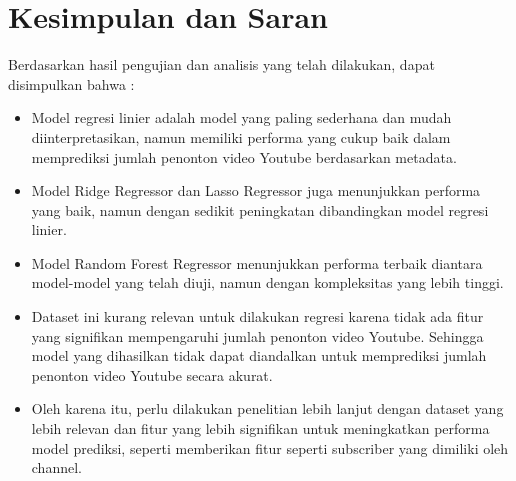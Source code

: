 \newpage
\section{Kesimpulan dan Saran}
Berdasarkan hasil pengujian dan analisis yang telah dilakukan, dapat disimpulkan bahwa : 
\begin{itemize}
    \item Model regresi linier adalah model yang paling sederhana dan mudah diinterpretasikan, namun memiliki performa yang cukup baik dalam memprediksi jumlah penonton video Youtube berdasarkan metadata.
    \item Model Ridge Regressor dan Lasso Regressor juga menunjukkan performa yang baik, namun dengan sedikit peningkatan dibandingkan model regresi linier.
    \item Model Random Forest Regressor menunjukkan performa terbaik diantara model-model yang telah diuji, namun dengan kompleksitas yang lebih tinggi.
    \item Dataset ini kurang relevan untuk dilakukan regresi karena tidak ada fitur yang signifikan mempengaruhi jumlah penonton video Youtube. Sehingga model yang dihasilkan tidak dapat diandalkan untuk memprediksi jumlah penonton video Youtube secara akurat.
    \item Oleh karena itu, perlu dilakukan penelitian lebih lanjut dengan dataset yang lebih relevan dan fitur yang lebih signifikan untuk meningkatkan performa model prediksi, seperti memberikan fitur seperti subscriber yang dimiliki oleh channel.
\end{itemize}